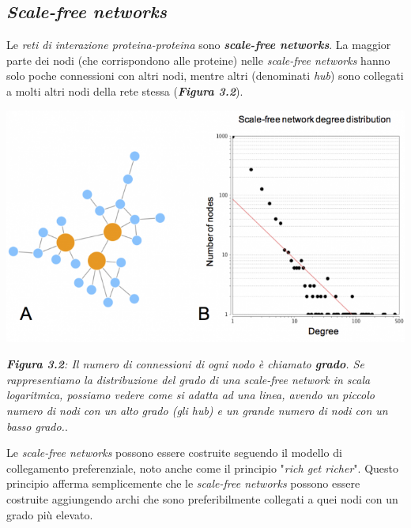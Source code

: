 \documentclass[11pt]{article}
\begin{document}
\subsection{\textit{Scale-free networks}}
Le \textit{reti di interazione proteina-proteina} sono \textit{\textbf{scale-free networks}}. La maggior parte dei nodi (che corrispondono alle proteine) nelle \textit{scale-free networks} hanno solo poche connessioni con altri nodi, mentre altri (denominati \textit{hub}) sono collegati a molti altri nodi della rete stessa (\textit{\textbf{Figura 3.2}}).

\begin{center}
\includegraphics[scale=0.5]{graffo}

\begin{small}\textit{\textbf{Figura 3.2}: Il numero di connessioni di ogni nodo è chiamato \textbf{grado}. Se rappresentiamo la distribuzione del grado di una \textit{scale-free network} in scala logaritmica, possiamo vedere come si adatta ad una linea, avendo un piccolo numero di nodi con un alto grado (gli hub) e un grande numero di nodi con un basso grado.}.\end{small}
\end{center}

Le \textit{scale-free networks} possono essere costruite seguendo il modello di collegamento preferenziale, noto anche come il principio "\textit{rich get richer}". Questo principio afferma semplicemente che le \textit{scale-free networks} possono essere costruite aggiungendo archi che sono preferibilmente collegati a quei nodi con un grado più elevato.
\end{document}
